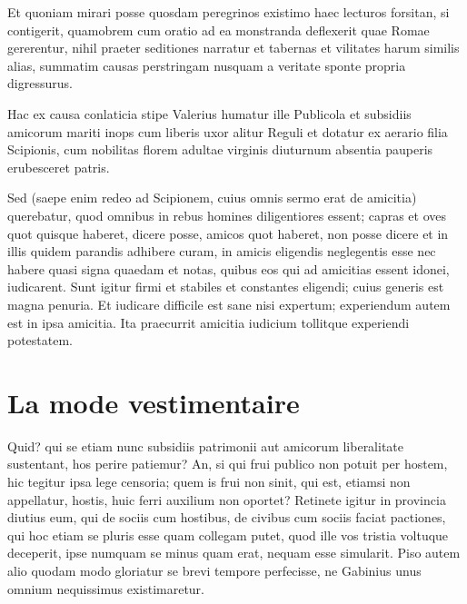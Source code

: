 \documentclass{framatexclass}
\begin{document}
Et quoniam mirari posse quosdam peregrinos existimo haec lecturos forsitan, si contigerit, quamobrem cum oratio ad ea monstranda deflexerit quae Romae gererentur, nihil praeter seditiones narratur et tabernas et vilitates harum similis alias, summatim causas perstringam nusquam a veritate sponte propria digressurus.

Hac ex causa conlaticia stipe Valerius humatur ille Publicola et subsidiis amicorum mariti inops cum liberis uxor alitur Reguli et dotatur ex aerario filia Scipionis, cum nobilitas florem adultae virginis diuturnum absentia pauperis erubesceret patris.

Sed (saepe enim redeo ad Scipionem, cuius omnis sermo erat de amicitia) querebatur, quod omnibus in rebus homines diligentiores essent; capras et oves quot quisque haberet, dicere posse, amicos quot haberet, non posse dicere et in illis quidem parandis adhibere curam, in amicis eligendis neglegentis esse nec habere quasi signa quaedam et notas, quibus eos qui ad amicitias essent idonei, iudicarent. Sunt igitur firmi et stabiles et constantes eligendi; cuius generis est magna penuria. Et iudicare difficile est sane nisi expertum; experiendum autem est in ipsa amicitia. Ita praecurrit amicitia iudicium tollitque experiendi potestatem.

           


                    

\mainmatter

                        
%


%

                        
                    

\chapter{La mode vestimentaire}
Quid? qui se etiam nunc subsidiis patrimonii aut amicorum liberalitate sustentant, hos perire patiemur? An, si qui frui publico non potuit per hostem, hic tegitur ipsa lege censoria; quem is frui non sinit, qui est, etiamsi non appellatur, hostis, huic ferri auxilium non oportet? Retinete igitur in provincia diutius eum, qui de sociis cum hostibus, de civibus cum sociis faciat pactiones, qui hoc etiam se pluris esse quam collegam putet, quod ille vos tristia voltuque deceperit, ipse numquam se minus quam erat, nequam esse simularit. Piso autem alio quodam modo gloriatur se brevi tempore perfecisse, ne Gabinius unus omnium nequissimus existimaretur.
\end{document}
